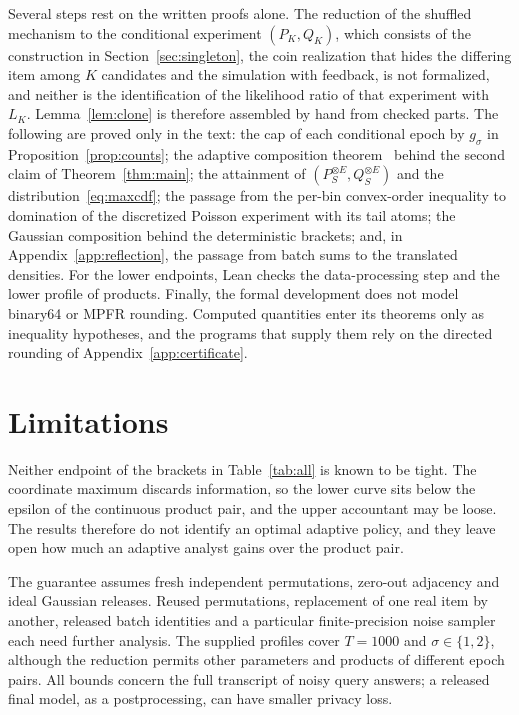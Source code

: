 \documentclass[conference]{IEEEtran}
\begin{document}
Several steps rest on the written proofs alone. The reduction of the shuffled mechanism to the conditional experiment $(P_K,Q_K)$, which consists of the construction in Section~\ref{sec:singleton}, the coin realization that hides the differing item among $K$ candidates and the simulation with feedback, is not formalized, and neither is the identification of the likelihood ratio of that experiment with $L_K$. Lemma~\ref{lem:clone} is therefore assembled by hand from checked parts. The following are proved only in the text: the cap of each conditional epoch by $g_\sigma$ in Proposition~\ref{prop:counts}; the adaptive composition theorem~\cite[Thm.~10]{zhu} behind the second claim of Theorem~\ref{thm:main}; the attainment of $(P_S^{\otimes E},Q_S^{\otimes E})$ and the distribution~\eqref{eq:maxcdf}; the passage from the per-bin convex-order inequality to domination of the discretized Poisson experiment with its tail atoms; the Gaussian composition behind the deterministic brackets; and, in Appendix~\ref{app:reflection}, the passage from batch sums to the translated densities. For the lower endpoints, Lean checks the data-processing step and the lower profile of products. Finally, the formal development does not model binary64 or MPFR rounding. Computed quantities enter its theorems only as inequality hypotheses, and the programs that supply them rely on the directed rounding of Appendix~\ref{app:certificate}.

\section{Limitations}
Neither endpoint of the brackets in Table~\ref{tab:all} is known to be tight. The coordinate maximum discards information, so the lower curve sits below the epsilon of the continuous product pair, and the upper accountant may be loose. The results therefore do not identify an optimal adaptive policy, and they leave open how much an adaptive analyst gains over the product pair.

The guarantee assumes fresh independent permutations, zero-out adjacency and ideal Gaussian releases. Reused permutations, replacement of one real item by another, released batch identities and a particular finite-precision noise sampler each need further analysis. The supplied profiles cover $T=1000$ and $\sigma\in\{1,2\}$, although the reduction permits other parameters and products of different epoch pairs. All bounds concern the full transcript of noisy query answers; a released final model, as a postprocessing, can have smaller privacy loss.
\end{document}
